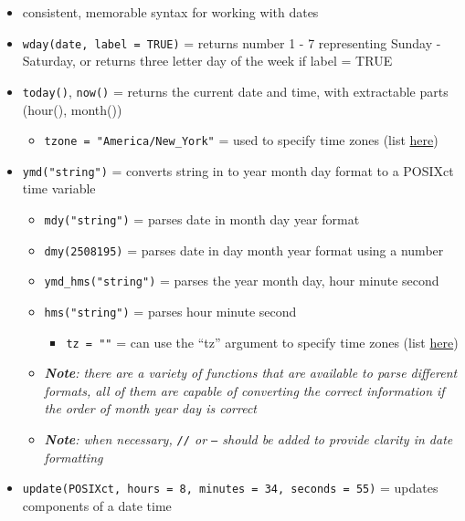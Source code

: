 \documentclass[
]{article}
\providecommand{\tightlist}{%
  \setlength{\itemsep}{0pt}\setlength{\parskip}{0pt}}
\begin{document}
\begin{itemize}
\tightlist
\item
  consistent, memorable syntax for working with dates
\item
  \texttt{wday(date,\ label\ =\ TRUE)} = returns number 1 - 7
  representing Sunday - Saturday, or returns three letter day of the
  week if label = TRUE
\item
  \texttt{today()}, \texttt{now()} = returns the current date and time,
  with extractable parts (hour(), month())

  \begin{itemize}
  \tightlist
  \item
    \texttt{tzone\ =\ "America/New\_York"} = used to specify time zones
    (list
    \href{http://en.wikipedia.org/wiki/List_of_tz_database_time_zones}{here})
  \end{itemize}
\item
  \texttt{ymd("string")} = converts string in to year month day format
  to a POSIXct time variable

  \begin{itemize}
  \tightlist
  \item
    \texttt{mdy("string")} = parses date in month day year format
  \item
    \texttt{dmy(2508195)} = parses date in day month year format using a
    number
  \item
    \texttt{ymd\_hms("string")} = parses the year month day, hour minute
    second
  \item
    \texttt{hms("string")} = parses hour minute second

    \begin{itemize}
    \tightlist
    \item
      \texttt{tz\ =\ ""} = can use the ``tz'' argument to specify time
      zones (list
      \href{http://en.wikipedia.org/wiki/List_of_tz_database_time_zones}{here})
    \end{itemize}
  \item
    \emph{\textbf{Note}: there are a variety of functions that are
    available to parse different formats, all of them are capable of
    converting the correct information if the order of month year day is
    correct }
  \item
    \emph{\textbf{Note}: when necessary, \texttt{//} or \texttt{—}
    should be added to provide clarity in date formatting }
  \end{itemize}
\item
  \texttt{update(POSIXct,\ hours\ =\ 8,\ minutes\ =\ 34,\ seconds\ =\ 55)}
  = updates components of a date time


\end{itemize}
\end{document}
